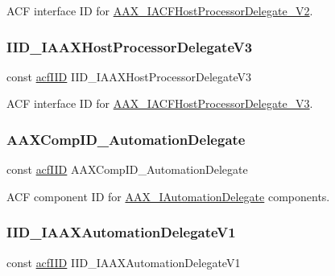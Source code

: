 A\+CF interface ID for \mbox{\hyperlink{a01705}{A\+A\+X\+\_\+\+I\+A\+C\+F\+Host\+Processor\+Delegate\+\_\+\+V2}}. 

\mbox{\label{a00683_a41c70d23eb7fdcc1fa69e5ffab1eb38a}} 
\subsubsection{\texorpdfstring{IID\_IAAXHostProcessorDelegateV3}{IID\_IAAXHostProcessorDelegateV3}}
{\footnotesize\ttfamily const \mbox{\hyperlink{a00269_a59df0b41744eee7a066787aaedf97f67}{acf\+I\+ID}} I\+I\+D\+\_\+\+I\+A\+A\+X\+Host\+Processor\+Delegate\+V3}



A\+CF interface ID for \mbox{\hyperlink{a01709}{A\+A\+X\+\_\+\+I\+A\+C\+F\+Host\+Processor\+Delegate\+\_\+\+V3}}. 

\mbox{\label{a00683_aa22fc51d81b9a4f8fab4f819ca3f85d9}} 
\subsubsection{\texorpdfstring{AAXCompID\_AutomationDelegate}{AAXCompID\_AutomationDelegate}}
{\footnotesize\ttfamily const \mbox{\hyperlink{a00269_a59df0b41744eee7a066787aaedf97f67}{acf\+I\+ID}} A\+A\+X\+Comp\+I\+D\+\_\+\+Automation\+Delegate}



A\+CF component ID for \mbox{\hyperlink{a01773}{A\+A\+X\+\_\+\+I\+Automation\+Delegate}} components. 

\mbox{\label{a00683_ae771259726eee32ff16e1399e03e4457}} 
\subsubsection{\texorpdfstring{IID\_IAAXAutomationDelegateV1}{IID\_IAAXAutomationDelegateV1}}
{\footnotesize\ttfamily const \mbox{\hyperlink{a00269_a59df0b41744eee7a066787aaedf97f67}{acf\+I\+ID}} I\+I\+D\+\_\+\+I\+A\+A\+X\+Automation\+Delegate\+V1}




